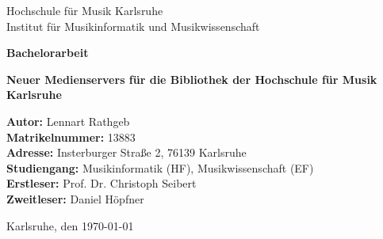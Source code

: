 \documentclass[12pt,a4paper]{report}
\begin{document}
\begin{titlepage}
    \centering
    {\Large Hochschule für Musik Karlsruhe \\[1em]}
    {\large Institut für Musikinformatik und Musikwissenschaft \\[6em]}

    {\Large \textbf{Bachelorarbeit} \\[2em]}

    {\LARGE \textbf{Neuer Medienservers für die Bibliothek der Hochschule für Musik Karlsruhe} \\[6em]}

    \begin{minipage}{0.9\textwidth}
        \raggedright
        \textbf{Autor:} Lennart Rathgeb \\
        \textbf{Matrikelnummer:} 13883 \\
        \textbf{Adresse:} Insterburger Straße 2, 76139 Karlsruhe \\
        \textbf{Studiengang:} Musikinformatik (HF), Musikwissenschaft (EF) \\
        \textbf{Erstleser:} Prof. Dr. Christoph Seibert \\
        \textbf{Zweitleser:} Daniel Höpfner \\
    \end{minipage}

    \vfill
    Karlsruhe, den \today
\end{titlepage}

\cleardoublepage
{}
\tableofcontents


\end{document}
